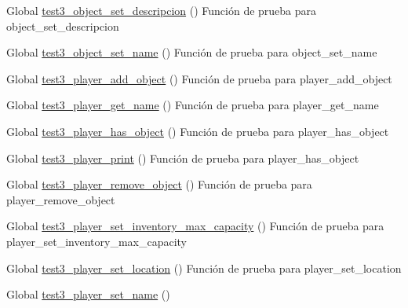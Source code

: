 \begin{DoxyRefList}
\item[Global \mbox{\hyperlink{object__test_8c_a84be9532a8a9cf53a00df0586d065b9f}{test3\+\_\+object\+\_\+set\+\_\+descripcion}} ()]\label{test__test000123}%
%
Función de prueba para object\+\_\+set\+\_\+descripcion  
\item[Global \mbox{\hyperlink{object__test_8c_ab40669b5d083b6484197d917fb6882b1}{test3\+\_\+object\+\_\+set\+\_\+name}} ()]\label{test__test000114}%
%
Función de prueba para object\+\_\+set\+\_\+name  
\item[Global \mbox{\hyperlink{player__test_8c_ac984e5292c95002644a7af4fa499d0fb}{test3\+\_\+player\+\_\+add\+\_\+object}} ()]\label{test__test000165}%
%
Función de prueba para player\+\_\+add\+\_\+object  
\item[Global \mbox{\hyperlink{player__test_8c_a47ca2429d85f332295322002954e1c89}{test3\+\_\+player\+\_\+get\+\_\+name}} ()]\label{test__test000158}%
%
Función de prueba para player\+\_\+get\+\_\+name  
\item[Global \mbox{\hyperlink{player__test_8c_a956409720fca92e245d798491200f3d6}{test3\+\_\+player\+\_\+has\+\_\+object}} ()]\label{test__test000176}%
%
Función de prueba para player\+\_\+has\+\_\+object  
\item[Global \mbox{\hyperlink{player__test_8c_a1d9fc6701483b45427b34a1d8e86e260}{test3\+\_\+player\+\_\+print}} ()]\label{test__test000184}%
%
Función de prueba para player\+\_\+has\+\_\+object  
\item[Global \mbox{\hyperlink{player__test_8c_af84155cb375301e75475a91ef522e191}{test3\+\_\+player\+\_\+remove\+\_\+object}} ()]\label{test__test000168}%
%
Función de prueba para player\+\_\+remove\+\_\+object  
\item[Global \mbox{\hyperlink{player__test_8c_ae3447f70a2f6ccb4f501f7630c667a73}{test3\+\_\+player\+\_\+set\+\_\+inventory\+\_\+max\+\_\+capacity}} ()]\label{test__test000181}%
%
Función de prueba para player\+\_\+set\+\_\+inventory\+\_\+max\+\_\+capacity  
\item[Global \mbox{\hyperlink{player__test_8c_a317c0c84ef6ef843c15d5bab4a6b8a38}{test3\+\_\+player\+\_\+set\+\_\+location}} ()]\label{test__test000171}%
%
Función de prueba para player\+\_\+set\+\_\+location  
\item[Global \mbox{\hyperlink{player__test_8c_a447ebbb4ba2206abeaf4b60200e312da}{test3\+\_\+player\+\_\+set\+\_\+name}} ()]\label{test__test000155}%

\end{DoxyRefList}

